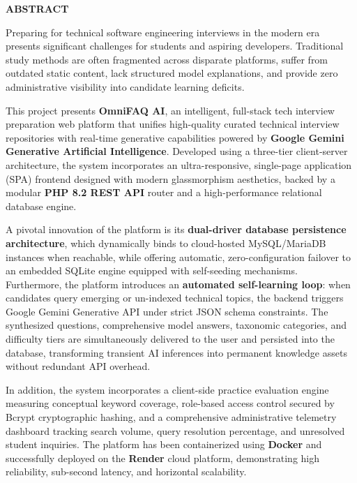 \documentclass[12pt,a4paper]{report}
\begin{document}
\begin{center}
    {\LARGE \textbf{\textcolor{skitnavy}{ABSTRACT}}}
\end{center}
\vspace{1cm}

Preparing for technical software engineering interviews in the modern era presents significant challenges for students and aspiring developers. Traditional study methods are often fragmented across disparate platforms, suffer from outdated static content, lack structured model explanations, and provide zero administrative visibility into candidate learning deficits. 

This project presents \textbf{OmniFAQ AI}, an intelligent, full-stack tech interview preparation web platform that unifies high-quality curated technical interview repositories with real-time generative capabilities powered by \textbf{Google Gemini Generative Artificial Intelligence}. Developed using a three-tier client-server architecture, the system incorporates an ultra-responsive, single-page application (SPA) frontend designed with modern glassmorphism aesthetics, backed by a modular \textbf{PHP 8.2 REST API} router and a high-performance relational database engine.

A pivotal innovation of the platform is its \textbf{dual-driver database persistence architecture}, which dynamically binds to cloud-hosted MySQL/MariaDB instances when reachable, while offering automatic, zero-configuration failover to an embedded SQLite engine equipped with self-seeding mechanisms. Furthermore, the platform introduces an \textbf{automated self-learning loop}: when candidates query emerging or un-indexed technical topics, the backend triggers Google Gemini Generative API under strict JSON schema constraints. The synthesized questions, comprehensive model answers, taxonomic categories, and difficulty tiers are simultaneously delivered to the user and persisted into the database, transforming transient AI inferences into permanent knowledge assets without redundant API overhead.

In addition, the system incorporates a client-side practice evaluation engine measuring conceptual keyword coverage, role-based access control secured by Bcrypt cryptographic hashing, and a comprehensive administrative telemetry dashboard tracking search volume, query resolution percentage, and unresolved student inquiries. The platform has been containerized using \textbf{Docker} and successfully deployed on the \textbf{Render} cloud platform, demonstrating high reliability, sub-second latency, and horizontal scalability.
\end{document}
